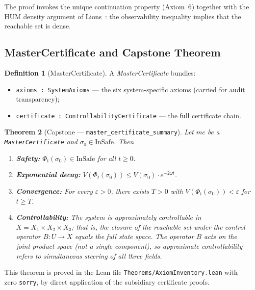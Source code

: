 \documentclass[11pt,a4paper]{article}
\theoremstyle{plain}
\newtheorem{theorem}{Theorem}[section]
\theoremstyle{definition}
\newtheorem{definition}[theorem]{Definition}
\theoremstyle{remark}
\newcommand{\InSafe}{\mathrm{InSafe}}
\newcommand{\sorry}{\texttt{sorry}}
\newcommand{\leaninline}[1]{\texttt{#1}}
\begin{document}
The proof invokes the unique continuation property (Axiom~6) together
with the HUM density argument of Lions~\cite{Lions1988}: the
observability inequality implies that the reachable set is dense.

\subsection{MasterCertificate and Capstone Theorem}

\begin{definition}[MasterCertificate]\label{def:master-cert}
A \emph{MasterCertificate} bundles:
\begin{itemize}
  \item \leaninline{axioms : SystemAxioms} --- the six system-specific
    axioms (carried for audit transparency);
  \item \leaninline{certificate : ControllabilityCertificate} --- the
    full certificate chain.
\end{itemize}
\end{definition}

\begin{theorem}[Capstone --- \leaninline{master\_certificate\_summary}]%
\label{thm:capstone}
Let $\mathit{mc}$ be a \leaninline{MasterCertificate} and
$\sigma_0 \in \InSafe$.  Then
\begin{enumerate}[label=(\arabic*)]
  \item \textbf{Safety:} $\Phi_t(\sigma_0) \in \InSafe$ for all $t \ge 0$.
  \item \textbf{Exponential decay:}
    $V(\Phi_t(\sigma_0)) \le V(\sigma_0) \cdot e^{-2\omega t}$.
  \item \textbf{Convergence:} For every $\varepsilon > 0$, there exists
    $T > 0$ with $V(\Phi_t(\sigma_0)) < \varepsilon$ for $t \ge T$.
  \item \textbf{Controllability:} The system is approximately
    controllable in $X = X_1 \times X_2 \times X_3$; that is, the
    closure of the reachable set under the control operator $B : U \to X$
    equals the full state space.  The operator $B$ acts on the joint
    product space (not a single component), so approximate
    controllability refers to simultaneous steering of all three fields.
\end{enumerate}
\end{theorem}

This theorem is proved in the Lean file
\leaninline{Theorems/AxiomInventory.lean} with zero \sorry{}, by
direct application of the subsidiary certificate proofs.
\end{document}
